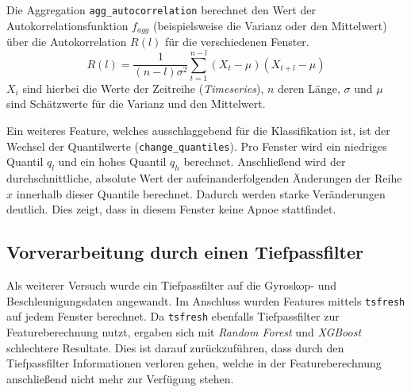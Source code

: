 Die Aggregation \texttt{agg\_autocorrelation} berechnet den Wert der Autokorrelationsfunktion $f_{agg}$ (beispielsweise die Varianz oder den Mittelwert) über die Autokorrelation $R(l)$ für die verschiedenen Fenster. 
\[R(l) = \frac{1}{(n-l)\sigma ^2} \sum_{t=1}^{n-l} (X_t - \mu) (X_{t+l} - \mu)\]
$X_i$ sind hierbei  die Werte der Zeitreihe (\textit{Timeseries}), $n$ deren Länge, $\sigma$ und $\mu$ sind Schätzwerte für die Varianz und den Mittelwert.

Ein weiteres Feature, welches ausschlaggebend für die Klassifikation ist, ist der Wechsel der Quantilwerte (\texttt{change\_quantiles}).
Pro Fenster wird ein niedriges Quantil $q_l$ und ein hohes Quantil $q_h$ berechnet. 
Anschließend wird der durchschnittliche, absolute Wert der aufeinanderfolgenden Änderungen der Reihe $x$ innerhalb dieser Quantile berechnet.
Dadurch werden starke Veränderungen deutlich.
Dies zeigt, dass in diesem Fenster keine Apnoe stattfindet. 

\subsection{Vorverarbeitung durch einen Tiefpassfilter}
Als weiterer Versuch wurde ein Tiefpassfilter auf die Gyroskop- und Beschleunigungsdaten angewandt. 
Im Anschluss wurden Features mittels \texttt{tsfresh} auf jedem Fenster berechnet.
Da \texttt{tsfresh} ebenfalls Tiefpassfilter zur Featureberechnung nutzt, ergaben sich mit \textit{Random Forest} und \textit{XGBoost} schlechtere Resultate.
Dies ist darauf zurückzuführen, dass durch den Tiefpassfilter Informationen verloren gehen, welche in der Featureberechnung anschließend nicht mehr zur Verfügung stehen. 

